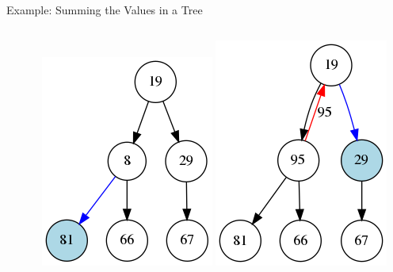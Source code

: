 \documentclass[11pt]{beamer}
\begin{document}
\begin{frame}{Example: Summing the Values in a Tree}
\begin{columns}
\begin{column}{0.33\textwidth}
\end{column}
\begin{column}{0.33\textwidth}
\center
\includegraphics[scale=0.3]{summing_tree_3.png}
\includegraphics[scale=0.3]{summing_tree_6.png}
\end{column}
\end{columns}
\end{frame}
\end{document}

